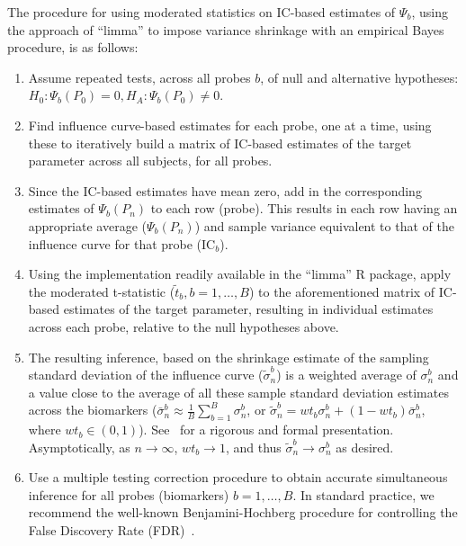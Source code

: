The procedure for using moderated statistics on IC-based estimates of $\Psi_b$,
using the approach of ``limma'' to impose variance shrinkage with an empirical
Bayes procedure, is as follows:

\begin{enumerate}
\item Assume repeated tests, across all probes $b$, of null and alternative
    hypotheses:\\$H_0: \Psi_b(P_0) = 0, H_A: \Psi_b(P_0) \ne 0 $.
\item Find influence curve-based estimates for each probe, one at a time, using
    these to iteratively build a matrix of IC-based estimates of the target
    parameter across all subjects, for all probes.
\item Since the IC-based estimates have mean zero, add in the corresponding
    estimates of $\Psi_b(P_n)$ to each row (probe). This results in each row
    having an appropriate average ($\Psi_b(P_n)$) and sample variance
    equivalent to that of the influence curve for that probe ($\text{IC}_b$).
\item Using the implementation readily available in the ``limma'' R package,
    apply the moderated t-statistic ($\tilde{t}_b, b = 1, \dots, B$) to the
    aforementioned matrix of IC-based estimates of the target parameter,
    resulting in individual estimates across each probe, relative to the null
    hypotheses above.
\item The resulting inference, based on the  shrinkage estimate of the
    sampling standard deviation of the influence curve ($\tilde{\sigma}^b_n$) is
    a weighted average of $\sigma^b_n$ and a value close to the average of all
    these sample standard deviation estimates across the biomarkers
    ($\bar{\sigma}^b_n \approx \frac{1}{B} \sum_{b = 1}^B \sigma^b_n$, or
    $\widetilde{\sigma}^b_n = wt_b \sigma^b_n+(1 - wt_b) \bar{\sigma}^b_n$,
    where $wt_b \in (0, 1)$). See~\cite{smyth2005limma} for a rigorous and
    formal presentation. Asymptotically, as $n \rightarrow \infty$,
    $wt_b \rightarrow 1$, and thus
    $\widetilde{\sigma}^b_n \rightarrow \sigma^b_n$ as desired.
\item Use a multiple testing correction procedure to obtain accurate
  simultaneous inference for all probes (biomarkers) $b = 1, \dots, B$. In
    standard practice, we recommend the well-known Benjamini-Hochberg procedure
    for controlling the False Discovery Rate
    (FDR)~\cite{benjamini1995controlling}.
\end{enumerate}

